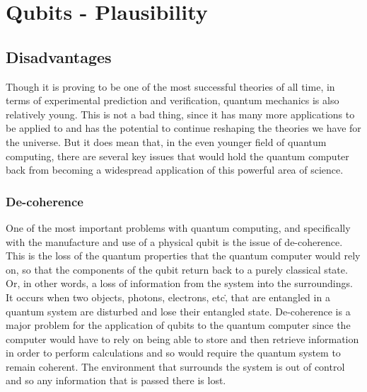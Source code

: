 
\section{Qubits - Plausibility}
\subsection{Disadvantages}
Though it is proving to be one of the most successful theories of all time, in terms of experimental prediction and verification, quantum mechanics is also relatively young. This is not a bad thing, since it has many more applications to be applied to and has the potential to continue reshaping the theories we have for the universe. But it does mean that, in the even younger field of quantum computing, there are several key issues that would hold the quantum computer back from becoming a widespread application of this powerful area of science.

\subsubsection{De-coherence}
One of the most important problems with quantum computing, and specifically with the manufacture and use of a physical qubit is the issue of de-coherence. This is the loss of the quantum properties that the quantum computer would rely on, so that the components of the qubit return back to a purely classical state. Or, in other words, a loss of information from the system into the surroundings. It occurs when two objects, photons, electrons, etc\., that are entangled in a quantum system are disturbed and lose their entangled state. De-coherence is a major problem for the application of qubits to the quantum computer since the computer would have to rely on being able to store and then retrieve information in order to perform calculations and so would require the quantum system to remain coherent. The environment that surrounds the system is out of control and so any information that is passed there is lost.

%		


